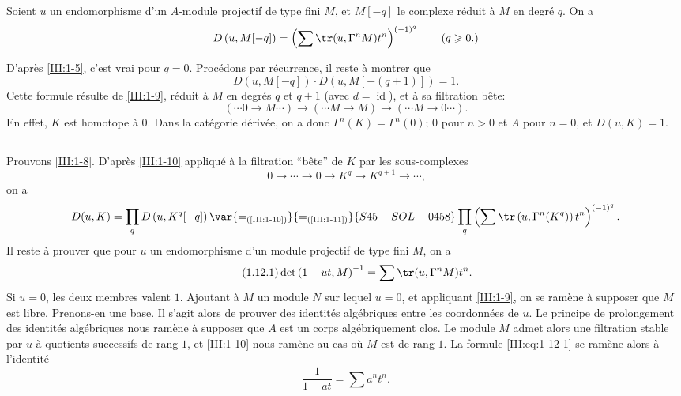 \begin{lemma_}\label{III:1-11}
Soient $u$ un endomorphisme d'un $A$-module projectif de type fini $M$, et 
$M[-q]$ le complexe réduit à $M$ en degré $q$. On a 
\[
  D\left(u,M[-q]\right) = \left(\sum \tr(u,\Gamma^n M) t^n\right)^{(-1)^q} \qquad \text{($q\geqslant 0$.)}
\]
\end{lemma_}





D'après \ref{III:1-5}, c'est vrai pour $q=0$. Procédons par récurrence, il 
reste à montrer que 
\[
  D\left(u,M[-q]\right) \cdot D\left(u,M[-(q+1)]\right) = 1 \text{.}
\]
Cette formule résulte de \ref{III:1-9},  réduit à 
$M$ en degrés $q$ et $q+1$ (avec $d=\operatorname{id}$), et à sa 
filtration bête:
\[
  (\cdots 0 \to M \cdots) \to (\cdots M \to M) \to (\cdots M \to 0 \cdots) \text{.}
\]
En effet, $K$ est homotope à $0$. Dans la catégorie dérivée, on a donc 
$\Gamma^n(K)=\Gamma^n(0)$; $0$ pour $n>0$ et $A$ pour $n=0$, et $D(u,K)=1$. 





\subsection{}\label{III:1-12}

Prouvons \ref{III:1-8}. D'après \ref{III:1-10} appliqué à la filtration 
``bête'' de $K$ par les sous-complexes 
\[
  0 \to \cdots \to 0 \to K^q \to K^{q+1} \to \cdots \text{,}
\]
on a 
\[
  D(u,K) = \prod_q D\left(u,K^q[-q]\right) \var{=_{\text{(\ref{III:1-10})}}}{=_{\text{(\ref{III:1-11})}}}{S45-SOL-0458} \prod_q \left(\sum \tr\left(u,\Gamma^n(K^q)\right) t^n \right)^{(-1)^q} \text{.}
\]
Il reste à prouver que pour $u$ un endomorphisme d'un module projectif de type 
fini $M$, on a 
\begin{equation*}\tag{1.12.1}\label{III:eq:1-12-1}
  \det\left(1-u t,M\right)^{-1} = \sum \tr(u,\Gamma^n M) t^n \text{.}
\end{equation*}
Si $u=0$, les deux membres valent $1$. Ajoutant à $M$ un module $N$ sur lequel 
$u=0$, et appliquant \ref{III:1-9}, on se ramène à supposer que $M$ est libre. 
Prenons-en une base. Il s'agit alors de prouver des identités algébriques 
entre les coordonnées de $u$. Le principe de prolongement des identités 
algébriques nous ramène à supposer que $A$ est un corps algébriquement 
clos. Le module $M$ admet alors une filtration stable par $u$ à quotients 
successifs de rang $1$, et \ref{III:1-10} nous ramène au cas où $M$ est de 
rang $1$. La formule \eqref{III:eq:1-12-1} se ramène alors à l'identité 
\[
  \frac{1}{1-a t} = \sum a^n t^n \text{.}
\]





